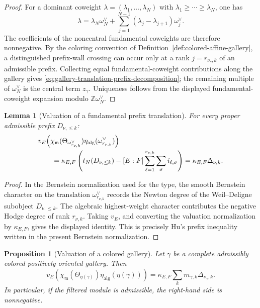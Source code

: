 \documentclass[12pt]{article}
\newtheorem{proposition}[theorem]{Proposition}
\newtheorem{lemma}[theorem]{Lemma}
\theoremstyle{definition}
\theoremstyle{remark}
\begin{document}
\begin{proof}
For a dominant coweight
\(\lambda=(\lambda_1,\ldots,\lambda_N)\) with
\(\lambda_1\geq\cdots\geq\lambda_N\), one has
\[
 \lambda
 =
 \lambda_N\omega_N^\vee
 +
 \sum_{j=1}^{N-1}
 (\lambda_j-\lambda_{j+1})\omega_j^\vee.
\]
The coefficients of the noncentral fundamental coweights are therefore
nonnegative.  By the coloring convention of
Definition~\ref{def:colored-affine-gallery}, a distinguished prefix-wall
crossing can occur only at a rank \(j=r_{\nu_\gamma,k}\) of an admissible
prefix.  Collecting equal fundamental-coweight contributions along the
gallery gives \eqref{eq:gallery-translation-prefix-decomposition}; the
remaining multiple of \(\omega_N^\vee\) is the central term \(z_\gamma\).
Uniqueness follows from the displayed fundamental-coweight expansion modulo
\(\mathbb Z\omega_N^\vee\).
\end{proof}

\begin{lemma}[Valuation of a fundamental prefix translation]
\label{lem:prefix-valuation}
For every proper admissible prefix \(D_{\nu,\leq k}\):
\begin{align}
 &v_E\!\left(
   \chi_{\mathfrak m}(\Theta_{\omega_{r_{\nu,k}}^\vee})
   \eta_{\mathrm{alg}}(\omega_{r_{\nu,k}}^\vee)
 \right) \notag\\
 &\qquad=
 \kappa_{E,F}
 \left(
  t_N(D_{\nu,\leq k})
  -[E:F]
   \sum_{\ell=1}^{r_{\nu,k}}\sum_\sigma i_{\ell,\sigma}
 \right)
 =\kappa_{E,F}\Delta_{\nu,k}.
 \label{eq:prefix-valuation}
\end{align}
\end{lemma}

\begin{proof}
In the Bernstein normalization used for the type, the smooth Bernstein
character on the translation
\(\omega_{r_{\nu,k}}^\vee\) records the Newton degree of the
Weil--Deligne subobject \(D_{\nu,\leq k}\).  The algebraic highest-weight
character contributes the negative Hodge degree of rank
\(r_{\nu,k}\).  Taking \(v_E\), and converting the valuation normalization
by \(\kappa_{E,F}\), gives the displayed identity.  This is precisely Hu's
prefix inequality written in the present Bernstein normalization.
\end{proof}

\begin{proposition}[Valuation of a colored gallery]
\label{prop:gallery-valuation}
Let \(\gamma\) be a complete admissibly colored positively oriented gallery.
Then
\begin{equation}\label{eq:gallery-valuation}
 v_E\left(
 \chi_{\mathfrak m}(\Theta_{\eta(\gamma)})
 \eta_{\mathrm{alg}}(\eta(\gamma))
 \right)
 =
 \kappa_{E,F}
 \sum_k
 m_{\gamma,k}
 \Delta_{\nu_\gamma,k}.
\end{equation}
In particular, if the filtered module is admissible, the right-hand side is
nonnegative.
\end{proposition}
\end{document}
